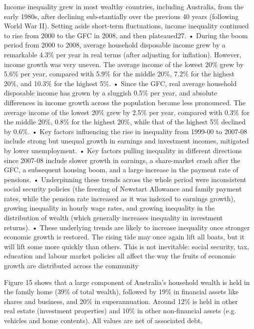 Income inequality grew in most wealthy countries, including Australia, from the early 1980s, after declining sub-stantially over the previous 40 years (following World War II). Setting aside short-term fluctuations, income inequality continued to rise from 2000 to the GFC in 2008, and then plateaued27.
• During the boom period from 2000 to 2008, average household disposable income grew by a remarkable 4.3\% per year in real terms (after adjusting for inflation).
However, income growth was very uneven. The average income of the lowest 20\% grew by 5.6\% per year, compared with 5.9\% for the middle 20\%, 7.2\% for the highest 20\%, and 10.3\% for the highest 5\%.
• Since the GFC, real average household disposable income has grown by a sluggish 0.5\% per year, and absolute differences in income growth across the population
became less pronounced. The average income of the lowest 20\% grew by 2.5\% per year, compared with 0.3\% for the middle 20\%, 0.8\% for the highest 20\%, while that of the highest 5\% declined by 0.6\%.
• Key factors influencing the rise in inequality from 1999-00 to 2007-08 include strong but unequal growth in earnings and investment incomes, mitigated by lower unemployment.
• Key factors pulling inequality in different directions since 2007-08 include slower growth in earnings, a share-market crash after the GFC, a subsequent housing boom, and a large increase in the payment rate of pensions.
• Underpinning these trends across the whole period were inconsistent social security
policies (the freezing of Newstart Allowance and family payment rates, while the pension rate increased as it was indexed to earnings growth), growing inequality in hourly wage rates, and growing inequality in the distribution of wealth (which generally increases inequality in investment returns).
• These underlying trends are likely to increase inequality once stronger economic growth is restored. The rising tide may once again lift all boats, but it will lift some more quickly than others. This is not inevitable: social security, tax, education and labour market policies all affect the way the fruits of economic growth are distributed across the community

Figure 15 shows that a large component of Australia’s household wealth is held in the family home (39\% of total wealth), followed by 19\% in financial assets like shares and business, and 20\% in superannuation. Around 12\% is held in other real estate (investment properties) and 10\% in other non-financial assets (e.g. vehicles and home contents). All values are net of associated debt.

